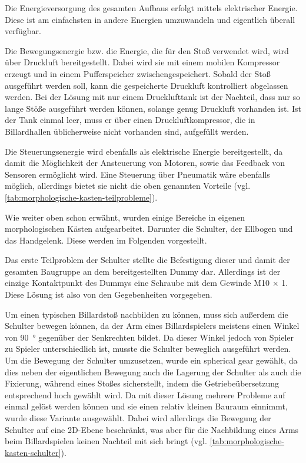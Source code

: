 		Die Energieversorgung des gesamten Aufbaus erfolgt mittels elektrischer Energie. Diese ist am einfachsten in andere Energien umzuwandeln und eigentlich überall verfügbar.\par\medskip
		Die Bewegungsenergie bzw. die Energie, die für den Stoß verwendet wird, wird über Druckluft bereitgestellt. Dabei wird sie mit einem mobilen Kompressor erzeugt und in einem Pufferspeicher zwischengespeichert. Sobald der Stoß ausgeführt werden soll, kann die gespeicherte Druckluft kontrolliert abgelassen werden. Bei der Lösung mit nur einem Drucklufttank ist der Nachteil, dass nur so lange Stöße ausgeführt werden können, solange genug Druckluft vorhanden ist. Ist der Tank einmal leer, muss er über einen Druckluftkompressor, die in Billardhallen üblicherweise nicht vorhanden sind, aufgefüllt werden.\par\medskip
		
		Die Steuerungsenergie wird ebenfalls als elektrische Energie bereitgestellt, da damit die Möglichkeit der Ansteuerung von Motoren, sowie das Feedback von Sensoren ermöglicht wird. Eine Steuerung über Pneumatik wäre ebenfalls möglich, allerdings bietet sie nicht die oben genannten Vorteile (vgl. \cref{tab:morphologische-kasten-teilprobleme}).\par\medskip
		
		Wie weiter oben schon erwähnt, wurden einige Bereiche in eigenen morphologischen Kästen aufgearbeitet. Darunter die Schulter, der Ellbogen und das Handgelenk. Diese werden im Folgenden vorgestellt.\par\medskip

		Das erste Teilproblem der Schulter stellte die Befestigung dieser und damit der gesamten Baugruppe an dem bereitgestellten Dummy dar. Allerdings ist der einzige Kontaktpunkt des Dummys eine Schraube mit dem Gewinde M10 $\times$ 1. Diese Lösung ist also von den Gegebenheiten vorgegeben.\par\medskip

		Um einen typischen Billardstoß nachbilden zu können, muss sich außerdem die Schulter bewegen können, da der Arm eines Billardspielers meistens einen Winkel von \SI{90}{\degree} gegenüber der Senkrechten bildet. Da dieser Winkel jedoch von Spieler zu Spieler unterschiedlich ist, musste die Schulter beweglich ausgeführt werden. Um die Bewegung der Schulter umzusetzen, wurde ein spherical gear gewählt, da dies neben der eigentlichen Bewegung auch die Lagerung der Schulter als auch die Fixierung, während eines Stoßes sicherstellt, indem die Getriebeübersetzung entsprechend hoch gewählt wird. Da mit dieser Lösung mehrere Probleme auf einmal gelöst werden können und sie einen relativ kleinen Bauraum einnimmt, wurde diese Variante ausgewählt. Dabei wird allerdings die Bewegung der Schulter auf eine 2D-Ebene beschränkt, was aber für die Nachbildung eines Arms beim Billardspielen keinen Nachteil mit sich bringt (vgl. \cref{tab:morphologische-kasten-schulter}).\par\medskip

